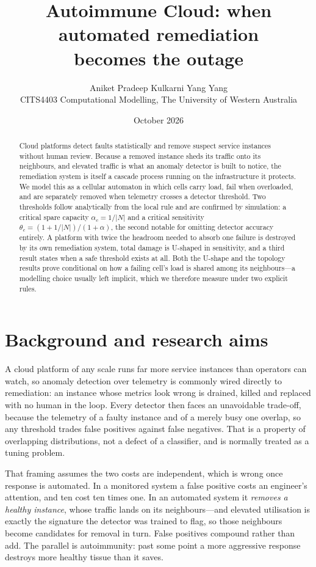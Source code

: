 \documentclass[11pt,a4paper]{article}
\title{\vspace{-2.5em}\textbf{Autoimmune Cloud: when automated remediation\\
becomes the outage}}
\author{Aniket Pradeep Kulkarni \quad\textbullet\quad Yang Yang\\[0.2em]
\small CITS4403 Computational Modelling, The University of Western Australia}
\date{\vspace{-0.8em}\small October 2026}
\begin{document}
\maketitle
\vspace{-1.5em}

\begin{abstract}
\noindent
Cloud platforms detect faults statistically and remove suspect service instances
without human review. Because a removed instance sheds its traffic onto its
neighbours, and elevated traffic is what an anomaly detector is built to notice,
the remediation system is itself a cascade process running on the infrastructure
it protects. We model this as a cellular automaton in which cells carry load,
fail when overloaded, and are separately removed when telemetry crosses a
detector threshold. Two thresholds follow analytically from the local rule and
are confirmed by simulation: a critical spare capacity $\alpha_c = 1/|N|$ and a
critical sensitivity $\theta_c = (1 + 1/|N|)/(1+\alpha)$, the second notable for
omitting detector accuracy entirely. A platform with twice the headroom needed
to absorb one failure is destroyed by its own remediation system, total damage
is U-shaped in sensitivity, and a third result states when a safe threshold
exists at all. Both the U-shape and the topology results prove conditional on
how a failing cell's load is shared among its neighbours---a modelling choice
usually left implicit, which we therefore measure under two explicit rules.
\end{abstract}

\vspace{-0.5em}
\section{Background and research aims}

A cloud platform of any scale runs far more service instances than operators can
watch, so anomaly detection over telemetry is commonly wired directly to
remediation: an instance whose metrics look wrong is drained, killed and
replaced with no human in the loop. Every detector then faces an unavoidable
trade-off, because the telemetry of a faulty instance and of a merely busy one
overlap, so any threshold trades false positives against false negatives. That
is a property of overlapping distributions, not a defect of a classifier, and is
normally treated as a tuning problem.

That framing assumes the two costs are independent, which is wrong once
response is automated. In a monitored system a false positive costs an
engineer's attention, and ten cost ten times one. In an automated system it
\emph{removes a healthy instance}, whose traffic lands on its neighbours---and
elevated utilisation is exactly the signature the detector was trained to flag,
so those neighbours become candidates for removal in turn. False positives
compound rather than add. The parallel is autoimmunity: past some point a more
aggressive response destroys more healthy tissue than it saves.
\end{document}
